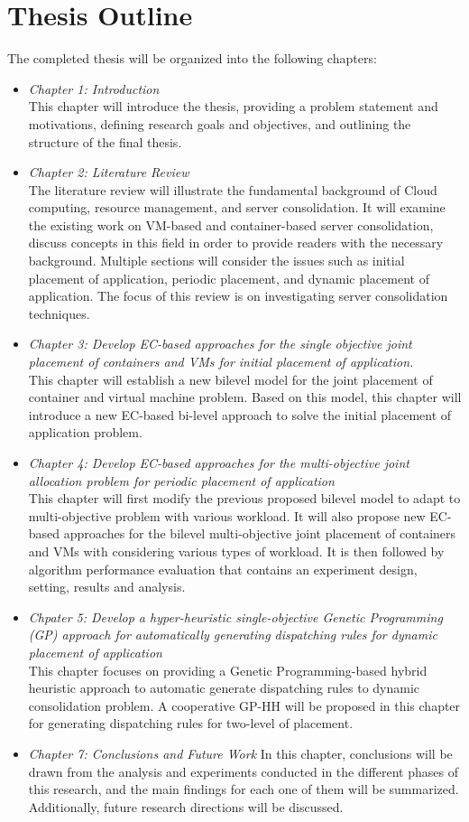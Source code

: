 \section{Thesis Outline}
The completed thesis will be organized into the following chapters:
\begin{itemize}
	\item \textit{Chapter 1: Introduction} \\
	This chapter will introduce the thesis, providing a problem statement and motivations, defining research goals and objectives, and outlining the structure of the final thesis.
	\item \textit{Chapter 2: Literature Review} \\
	The literature review will illustrate the fundamental background of Cloud computing, resource management, and server consolidation. It will examine the existing work on VM-based and container-based server consolidation, discuss concepts in this field in order to provide readers with the necessary background. Multiple sections will consider the issues such as initial placement of application, periodic placement, and dynamic placement of application. The focus of this review is on investigating server consolidation techniques.
	\item \textit{Chapter 3: Develop EC-based approaches for the single objective joint placement of containers and VMs for initial placement of application.} \\
	This chapter will establish a new bilevel model for the joint placement of container and virtual machine problem. Based on this model, this chapter will introduce a new EC-based bi-level approach to solve the initial placement of application problem. 
	\item \textit{Chapter 4: Develop EC-based approaches for the multi-objective joint allocation problem for periodic placement of application} \\
	This chapter will first modify the previous proposed bilevel model to adapt to multi-objective problem with various workload.  It will also propose new EC-based approaches for the bilevel multi-objective joint placement of containers and VMs with considering various types of workload. It is then followed by algorithm performance evaluation that contains an experiment design, setting, results and analysis.
	\item \textit{Chpater 5: Develop a hyper-heuristic single-objective Genetic Programming (GP) approach for automatically generating dispatching rules for dynamic placement of application} \\
	This chapter focuses on providing a Genetic Programming-based hybrid heuristic approach to automatic generate dispatching rules to dynamic consolidation problem. A cooperative GP-HH will be proposed in this chapter for generating dispatching rules for two-level of placement.
	\item \textit{Chapter 7: Conclusions and Future Work}
	In this chapter, conclusions will be drawn from the analysis and experiments conducted in the different phases of this research, and the main findings for each one of them will be summarized. Additionally, future research directions will be discussed.


\end{itemize}
